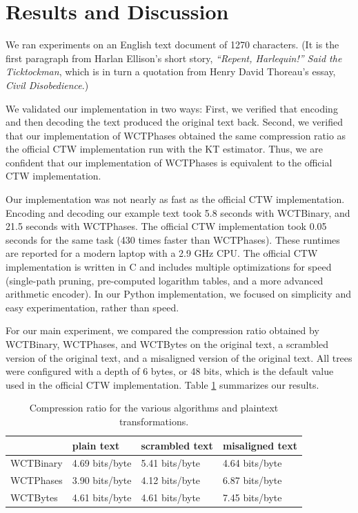 \documentclass[11pt]{scrartcl}
\begin{document}
\section{Results and Discussion}
\label{sec:results}

We ran experiments on an English text document of 1270 characters. (It is the
first paragraph from Harlan Ellison's short story, {\em ``Repent, Harlequin!''
Said the Ticktockman}, which is in turn a quotation from Henry David Thoreau's
essay, {\em Civil Disobedience}.)

We validated our implementation in two ways: First, we verified that encoding
and then decoding the text produced the original text back. Second, we verified
that our implementation of WCTPhases obtained the same compression ratio as the
official CTW implementation run with the KT estimator. Thus, we are confident
that our implementation of WCTPhases is equivalent to the official CTW
implementation.

Our implementation was not nearly as fast as the official CTW implementation.
Encoding and decoding our example text took 5.8 seconds with WCTBinary, and
21.5 seconds with WCTPhases. The official CTW implementation took 0.05 seconds
for the same task (430 times faster than WCTPhases). These runtimes are
reported for a modern laptop with a 2.9 GHz CPU. The official CTW
implementation is written in C and includes multiple optimizations for speed
(single-path pruning, pre-computed logarithm tables, and a more advanced
arithmetic encoder). In our Python implementation, we focused on simplicity and
easy experimentation, rather than speed.

For our main experiment, we compared the compression ratio obtained by
WCTBinary, WCTPhases, and WCTBytes on the original text, a scrambled version of
the original text, and a misaligned version of the original text. All trees
were configured with a depth of 6 bytes, or 48 bits, which is the default value
used in the official CTW implementation. Table \ref{tab:results} summarizes our
results.

\begin{table}[h!]
    \centering
    \begin{tabular}{l|lll}
        & plain text & scrambled text & misaligned text \\
        \hline
        WCTBinary & 4.69 bits/byte & 5.41 bits/byte & 4.64 bits/byte \\
        WCTPhases & 3.90 bits/byte & 4.12 bits/byte & 6.87 bits/byte \\
        WCTBytes  & 4.61 bits/byte & 4.61 bits/byte & 7.45 bits/byte \\
    \end{tabular}
    \caption{Compression ratio for the various algorithms and plaintext
    transformations.}
    \label{tab:results}
\end{table}
\end{document}
